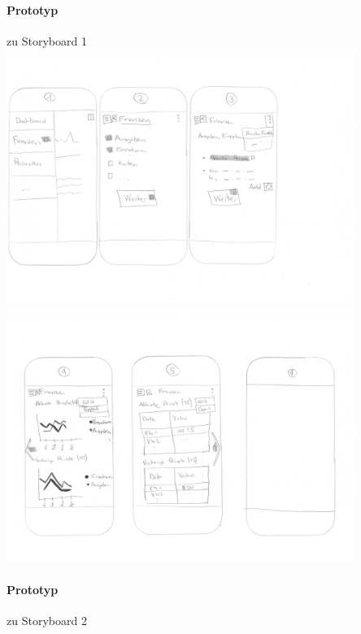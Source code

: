 \documentclass[a4paper]{scrreprt}
\begin{document}
\paragraph{Prototyp } zu Storyboard 1\\
\includegraphics[width=0.85\textwidth]{storyboards_personas_prototypes/iteration3/sidlm3_storyboard2_prototype1_1.png}\\
\includegraphics[width=0.85\textwidth]{storyboards_personas_prototypes/iteration3/sidlm3_storyboard2_prototype1_2.png}

\paragraph{Prototyp } zu Storyboard 2\\
\end{document}
